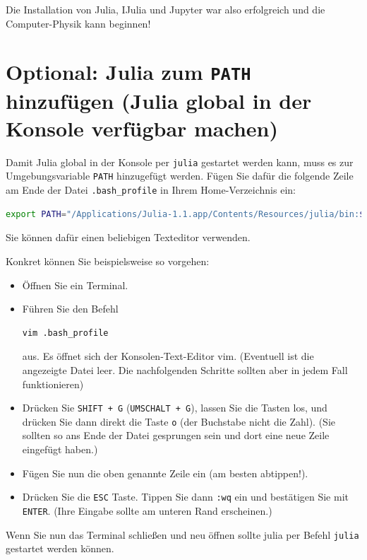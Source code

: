 \documentclass[11pt, a4paper]{scrartcl}
\begin{document}
	Die Installation von Julia, IJulia und Jupyter war also erfolgreich und die Computer-Physik kann beginnen!
	
	
	\newpage
	\section{Optional: Julia zum \texttt{PATH} hinzufügen (Julia global in der Konsole verfügbar machen)}
	
	Damit Julia global in der Konsole per \texttt{julia} gestartet werden kann, muss es zur Umgebungsvariable \texttt{PATH} hinzugefügt werden. Fügen Sie dafür die folgende Zeile am Ende der Datei \texttt{.bash\_profile} in Ihrem Home-Verzeichnis ein:
	
	\begin{lstlisting}[language=bash, columns=fixed, breaklines=false]
	export PATH="/Applications/Julia-1.1.app/Contents/Resources/julia/bin:$PATH"
	\end{lstlisting}
	
	Sie können dafür einen beliebigen Texteditor verwenden.
	
	Konkret können Sie beispielsweise so vorgehen:
	
	\begin{itemize}
		\item Öffnen Sie ein Terminal.
		\item Führen Sie den Befehl 
		\begin{lstlisting}[language=bash, columns=fixed, breaklines=false]
		vim .bash_profile
		\end{lstlisting}
		aus. Es öffnet sich der Konsolen-Text-Editor vim. (Eventuell ist die angezeigte Datei leer. Die nachfolgenden Schritte sollten aber in jedem Fall funktionieren)
		\item Drücken Sie \texttt{SHIFT + G} (\texttt{UMSCHALT + G}), lassen Sie die Tasten los, und drücken Sie dann direkt die Taste \texttt{o} (der Buchstabe nicht die Zahl). (Sie sollten so ans Ende der Datei gesprungen sein und dort eine neue Zeile eingefügt haben.)
		\item Fügen Sie nun die oben genannte Zeile ein (am besten abtippen!).
		\item Drücken Sie die \texttt{ESC} Taste. Tippen Sie dann \texttt{:wq} ein und bestätigen Sie mit \texttt{ENTER}. (Ihre Eingabe sollte am unteren Rand erscheinen.)
	\end{itemize}
	
	Wenn Sie nun das Terminal schließen und neu öffnen sollte julia per Befehl \texttt{julia} gestartet werden können.
	
\end{document}

